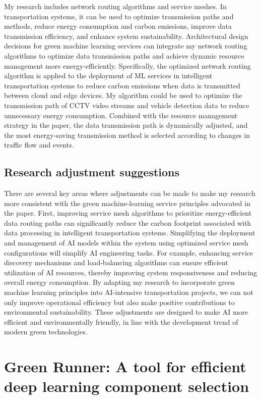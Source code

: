 \documentclass[11pt]{report}
\begin{document}
My research includes network routing algorithms and service meshes. In transportation systems, it can be used to optimize transmission paths and methods, reduce energy consumption and carbon emissions, improve data transmission efficiency, and enhance system sustainability. Architectural design decisions for green machine learning services can integrate my network routing algorithms to optimize data transmission paths and achieve dynamic resource management more energy-efficiently. Specifically, the optimized network routing algorithm is applied to the deployment of ML services in intelligent transportation systems to reduce carbon emissions when data is transmitted between cloud and edge devices. My algorithm could be used to optimize the transmission path of CCTV video streams and vehicle detection data to reduce unnecessary energy consumption. Combined with the resource management strategy in the paper, the data transmission path is dynamically adjusted, and the most energy-saving transmission method is selected according to changes in traffic flow and events.


\subsection{Research adjustment suggestions}
\label{adjustment1}

There are several key areas where adjustments can be made to make my research more consistent with the green machine-learning service principles advocated in the paper. First, improving service mesh algorithms to prioritize energy-efficient data routing paths can significantly reduce the carbon footprint associated with data processing in intelligent transportation systems. Simplifying the deployment and management of AI models within the system using optimized service mesh configurations will simplify AI engineering tasks. For example, enhancing service discovery mechanisms and load-balancing algorithms can ensure efficient utilization of AI resources, thereby improving system responsiveness and reducing overall energy consumption. By adapting my research to incorporate green machine learning principles into AI-intensive transportation projects, we can not only improve operational efficiency but also make positive contributions to environmental sustainability. These adjustments are designed to make AI more efficient and environmentally friendly, in line with the development trend of modern green technologies.

\section{Green Runner: A tool for efficient deep learning component selection}
\label{sec:paper2}
\end{document}
